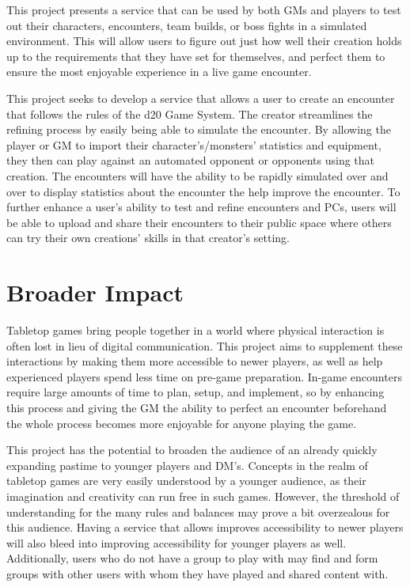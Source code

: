 \documentclass[12pt,a4paper]{report}
\begin{document}
This project presents a service that can be used by both GMs and players to test out their characters, encounters, team builds, or boss fights in a simulated environment. This will allow users to figure out just how well their creation holds up to the requirements that they have set for themselves, and perfect them to ensure the most enjoyable experience in a live game encounter.

This project seeks to develop a service that allows a user to create an encounter that follows the rules of the d20 Game System. The creator streamlines the refining process by easily being able to simulate the encounter. By allowing the player or GM to import their character's/monsters' statistics and equipment, they then can play against an automated opponent or opponents using that creation. The encounters will have the ability to be rapidly simulated over and over to display statistics about the encounter the help improve the encounter. To further enhance a user's ability to test and refine encounters and PCs, users will be able to upload and share their encounters to their public space where others can try their own creations' skills in that creator's setting.

\newpage
\chapter*{Broader Impact}

Tabletop games bring people together in a world where physical interaction is often lost in lieu of digital communication. This project aims to supplement these interactions by making them more accessible to newer players, as well as help experienced players spend less time on pre-game preparation. In-game encounters require large amounts of time to plan, setup, and implement, so by enhancing this process and giving the GM the ability to perfect an encounter beforehand the whole process becomes more enjoyable for anyone playing the game.

This project has the potential to broaden the audience of an already quickly expanding pastime to younger players and DM's. Concepts in the realm of tabletop games are very easily understood by a younger audience, as their imagination and creativity can run free in such games. However, the threshold of understanding for the many rules and balances may prove a bit overzealous for this audience. Having a service that allows improves accessibility to newer players will also bleed into improving accessibility for younger players as well. Additionally, users who do not have a group to play with may find and form groups with other users with whom they have played and shared content with.
	
\end{document}
